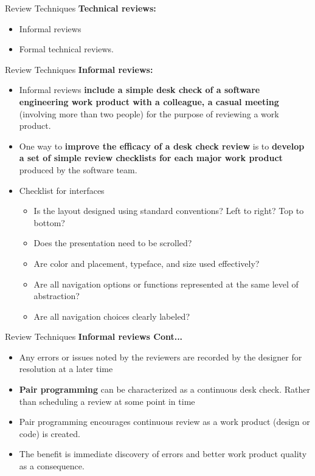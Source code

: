 \documentclass{beamer}
\begin{document}
\begin{frame}{Review Techniques}
	\textbf{Technical reviews:}
	\begin{itemize}
		\item Informal reviews
		\item Formal technical reviews. 
		
	\end{itemize}
	
\end{frame}
\begin{frame}{Review Techniques}
	\textbf{Informal reviews:}
	\begin{itemize}
		\item Informal reviews \textbf{include a simple desk check of a software engineering work product with 
			a colleague, a casual meeting }(involving more than two people) for the purpose of 
		reviewing a work product.
		\item One way to\textbf{ improve the efficacy of a desk check review} is to\textbf{ develop 
			a set of simple review checklists for each major work product }
		produced by the software team.
		\item Checklist for interfaces
		\begin{itemize}
			\item Is the layout designed using standard conventions? Left to right? Top 
			to bottom? 
		\item Does the presentation need to be scrolled? 
			\item Are color and placement, typeface, and size used effectively?
			\item Are all navigation options or functions represented at the same level of 
			abstraction? 
			\item Are all navigation choices clearly labeled?
		\end{itemize}
		
	\end{itemize}
	
\end{frame}
\begin{frame}{Review Techniques}
	\textbf{Informal reviews Cont...}
	\begin{itemize}
		\item Any errors or issues noted by the reviewers are recorded by the designer 
		for resolution at a later time
		\item \textbf{Pair programming} can be characterized as a continuous desk check. 
		Rather than scheduling a review at some point in time
		\item Pair programming encourages continuous review as a work product 
		(design or code) is created. 
		\item The benefit is immediate discovery of errors and better work product 
		quality as a consequence.
	\end{itemize}
	
\end{frame}
\end{document}
